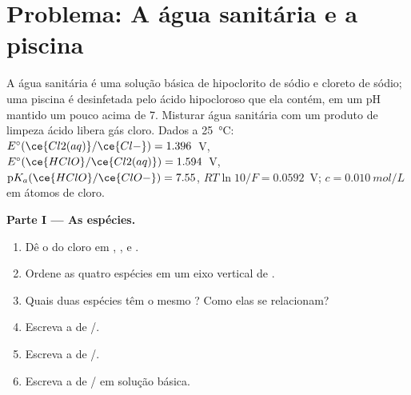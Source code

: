 \section{Problema: A água sanitária e a piscina}

\begin{problem}
\label{pb:b1:e-ph-diagrams:1}
A água sanitária é uma solução básica de hipoclorito de sódio e cloreto
de sódio; uma piscina é desinfetada pelo ácido hipocloroso que ela
contém, em um pH mantido um pouco acima de 7. Misturar água sanitária
com um produto de limpeza ácido libera gás cloro. Dados a
\qty{25}{\celsius}: $E^\circ(\ce{Cl2(aq)}/\ce{Cl-})
= 1.396$~V, $E^\circ(\ce{HClO}/\ce{Cl2(aq)}) = 1.594$~V,
$\mathrm{p}K_a(\ce{HClO}/\ce{ClO-}) = 7.55$, $RT\ln 10/F = 0.0592$~V;
 $c = \qty{0.010}{mol/L}$ em átomos de cloro.

\medskip
\noindent\textbf{Parte I --- As espécies.}
\begin{enumerate}
  \item Dê o  do cloro em , ,
         e .
  \item Ordene as quatro espécies em um eixo vertical de .
  \item Quais duas espécies têm o mesmo ? Como elas se
        relacionam?
  \item Escreva a  de /.
  \item Escreva a  de /.
  \item Escreva a  de / em solução básica.
\end{enumerate}


\end{problem}
